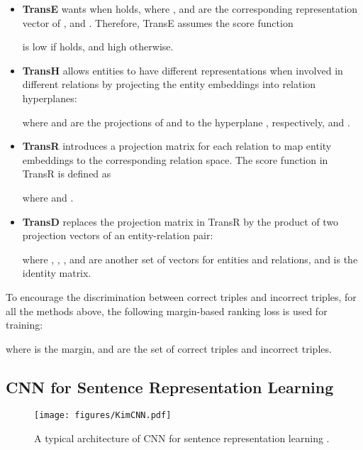 \documentclass[sigconf]{acmart}
\begin{document}
		\begin{itemize}
			\item
			\textbf{TransE} \cite{bordes2013translating} wants  when  holds, where ,  and  are the corresponding representation vector of ,  and .
			Therefore, TransE assumes the score function
			
			is low if  holds, and high otherwise.
		
			\item
			\textbf{TransH} \cite{wang2014knowledge} allows entities to have different representations when involved in different relations by projecting the entity embeddings into relation hyperplanes:

			where  and  are the projections of  and  to the hyperplane , respectively, and .
		
			\item
			\textbf{TransR} \cite{lin2015learning} introduces a projection matrix  for each relation  to map entity embeddings to the corresponding relation space.
			The score function in TransR is defined as
			
			where  and .
		
			\item
			\textbf{TransD} \cite{ji2015knowledge} replaces the projection matrix in TransR by the product of two projection vectors of an entity-relation pair:
			
			where , , ,  and  are another set of vectors for entities and relations, and  is the identity matrix.
		\end{itemize}
		
		To encourage the discrimination between correct triples and incorrect triples, for all the methods above, the following margin-based ranking loss is used for training:
		
		where  is the margin,  and  are the set of correct triples and incorrect triples.
		
		
	\subsection{CNN for Sentence Representation Learning}
	\label{sec:cnn_srl}
		\begin{figure}[t]
			\centering
  			\texttt{[image: figures/KimCNN.pdf]}
  			\caption{A typical architecture of CNN for sentence representation learning \cite{kim2014convolutional}.}
  			\label{fig:kim_cnn}
		\end{figure}
		
\end{document}
